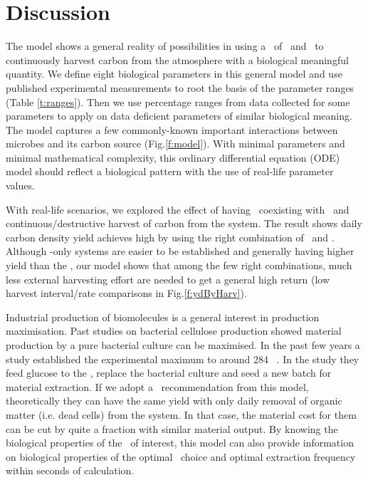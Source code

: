 \documentclass[../thesis.tex]{subfiles} %
\begin{document}
\section{Discussion}
The model shows a general reality of possibilities in using a \pbs\ of \bac\ and \phy\ to continuously harvest carbon from the atmosphere with a biological meaningful quantity.  We define eight biological parameters in this general model and use published experimental measurements to root the basis of the parameter ranges (Table \ref{t:ranges}).  Then we use percentage ranges from data collected for some parameters to apply on data deficient parameters of similar biological meaning.  The model captures a few commonly-known important interactions between microbes and its carbon source (Fig.\ref{f:model}).  With minimal parameters and minimal mathematical complexity, this ordinary differential equation (ODE) model should reflect a biological pattern with the use of real-life parameter values.

With real-life scenarios, we explored the effect of having \bac\ coexisting with \phy\ and continuous/destructive harvest of carbon from the system.  The result shows daily carbon density yield achieves high by using the right combination of \phy\ and \bac.  Although \phy-only systems are easier to be established and generally having higher yield than the \pbs, our model shows that among the few right combinations, much less external harvesting effort are needed to get a general high return (low harvest interval/rate comparisons in Fig.\ref{f:ydByHarv}).

Industrial production of biomolecules is a general interest in production maximisation.  Past studies on bacterial cellulose production showed material production by a pure bacterial culture can be maximised.  In the past few years a study established the experimental maximum to around 284 \dxdt\ \autocite{aytekin2016statistical}.  In the study they feed glucose to the \bac, replace the bacterial culture and seed a new batch for material extraction.  If we adopt a \phy\ recommendation from this model, theoretically they can have the same yield with only daily removal of organic matter (i.e. dead cells) from the system.  In that case, the material cost for them can be cut by quite a fraction with similar material output.  By knowing the biological properties of the \bac\ of interest, this model can also provide information on biological properties of the optimal \phy\ choice and optimal extraction frequency within seconds of calculation.
\end{document}
